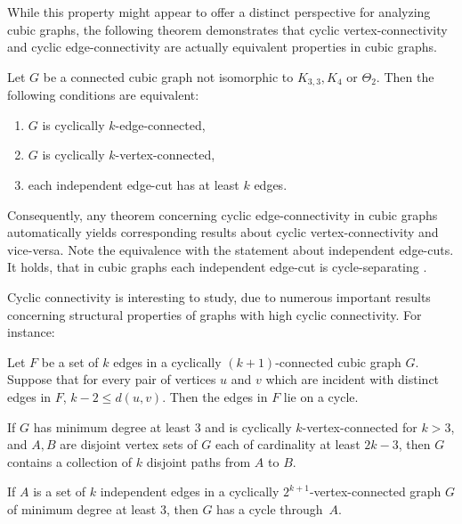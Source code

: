 \documentclass[12pt, twoside]{book}
\begin{document}
While this property might appear to offer a distinct perspective for analyzing cubic graphs, the following theorem demonstrates that cyclic \mbox{vertex-connectivity} and cyclic \mbox{edge-connectivity} are actually equivalent properties in cubic graphs.

\begin{theorem}\label{th:cyclic-vertex-edge-independent-equivalence}
	Let $G$ be a connected cubic graph not isomorphic to $K_{3,3},K_4$ or $\Theta_2$. Then the following conditions are equivalent:
	\begin{enumerate}[label=(\roman*)]
		\item $G$ is cyclically $k$-edge-connected,
		\item $G$ is cyclically $k$-vertex-connected,
		\item each independent edge-cut has at least $k$ edges.
	\end{enumerate}
\end{theorem}

Consequently, any theorem concerning cyclic edge-connectivity in cubic graphs automatically yields corresponding results about cyclic vertex-connectivity and \mbox{vice-versa}. Note the equivalence with the statement about independent edge-cuts. It holds, that in cubic graphs each independent edge-cut is cycle-separating \cite{atoms-of-cyclic}.

Cyclic connectivity is interesting to study, due to numerous important results concerning structural properties of graphs with high cyclic connectivity. For instance:

\begin{theorem}
	Let $F$ be a set of $k$ edges in a cyclically $(k + 1)$-connected cubic graph $G$. Suppose that for every pair of vertices $u$ and $v$ which are incident with distinct edges in $F$, $k - 2\leq d(u,v)$. Then the edges in $F$ lie on a cycle.
\end{theorem}

\begin{proposition}
	If $G$ has minimum degree at least 3 and is cyclically $k$-vertex-connected for $k > 3$, and $A, B$ are disjoint vertex sets of $G$ each of cardinality at least $2k - 3$, then $G$ contains a collection of $k$ disjoint paths from $A$ to $B$.
\end{proposition}

\begin{theorem}
	If $A$ is a set of $k$ independent edges in a cyclically \mbox{$2^{k+1}$-vertex-connected} graph $G$ of minimum degree at least 3, then $G$ has a cycle \mbox{through $A$}.
\end{theorem}
\end{document}
